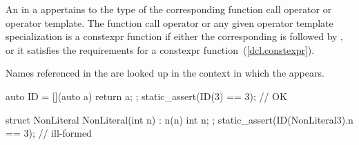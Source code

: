 An  in a  appertains
to the type of the corresponding function call operator or operator template.
The function call operator or any given operator template specialization
is a constexpr function if either
the corresponding 
 is followed by , or
it satisfies the requirements for a constexpr function~(\ref{dcl.constexpr}).
\begin{note} Names referenced in
the  are looked up in the context in which the
 appears. \end{note}
\begin{example}
\begin{codeblock}
auto ID = [](auto a) { return a; };
static_assert(ID(3) == 3); // OK

struct NonLiteral {
  NonLiteral(int n) : n(n) { }
  int n;
};
static_assert(ID(NonLiteral{3}).n == 3); // ill-formed
\end{codeblock}
\end{example}

